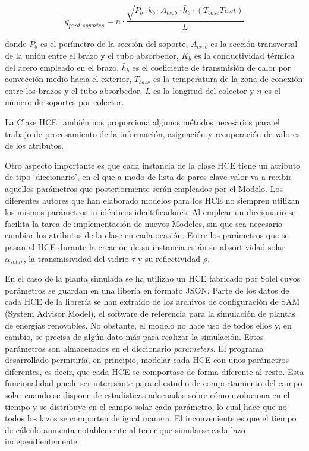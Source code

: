 \begin{equation}
   \dot q_{perd,soportes} =  n \cdot \frac{\sqrt{P_b \cdot k_b \cdot A_{cs,b} \cdot \bar h_b} \cdot (T_{base}T{ext})}{L}
    \label{eq:qperdidassoportes}
\end{equation}

donde \(P_b\) es el perímetro de la sección del soporte, \(A_{cs,b}\) es
la sección transversal de la unión entre el brazo y el tubo absorbedor,
\(K_b\) es la conductividad térmica del acero empleado en el brazo,
\(\bar h_b\) es el coeficiente de transmisión de calor por convección
medio hacia el exterior, \(T_{base}\) es la temperatura de la zona de
conexión entre los brazos y el tubo absorbedor, \(L\) es la longitud del
colector y \(n\) es el número de soportes por colector.

La Clase HCE también nos proporciona algunos métodos necesarios para el
trabajo de procesamiento de la información, asignación y recuperación de
valores de los atributos.

Otro aspecto importante es que cada instancia de la clase HCE tiene un
atributo de tipo `diccionario', en el que a modo de lista de pares
clave-valor va a recibir aquellos parámetros que posteriormente serán
empleados por el Modelo. Los diferentes autores que han elaborado
modelos para los HCE no siempren utilizan los mismos parámetros ni
idénticos identificadores. Al emplear un diccionario se facilita la
tarea de implementación de nuevos Modelos, sin que sea necesario cambiar
los atributos de la clase en cada ocasión. Entre los parámetros que se
pasan al HCE durante la creación de su instancia están su absortividad
solar \(\alpha_{solar}\), la transmisividad del vidrio \(\tau\) y su
reflectividad \(\rho\).

En el caso de la planta simulada se ha utilizao un HCE fabricado por
Solel cuyos parámetros se guardan en una libería en formato JSON. Parte
de los datos de cada HCE de la librería se han extraído de los archivos
de configuración de SAM (System Advisor Model), el software de
referencia para la simulación de plantas de energías renovables. No
obstante, el modelo no hace uso de todos ellos y, en cambio, se precisa
de algún dato más para realizar la simulación. Estos parámetros son
almacenados en el diccionario \emph{parameters}. El programa
desarrollado permitiría, en principio, modelar cada HCE con unos
parámetros diferentes, es decir, que cada HCE se comportase de forma
diferente al resto. Esta funcionalidad puede ser interesante para el
estudio de comportamiento del campo solar cuando se dispone de
estadísticas adecuadas sobre cómo evoluciona en el tiempo y se
distribuye en el campo solar cada parámetro, lo cual hace que no todos
los lazos se comporten de igual manera. El inconveniente es que el
tiempo de cálculo aumenta notablemente al tener que simularse cada lazo
independientemente.

